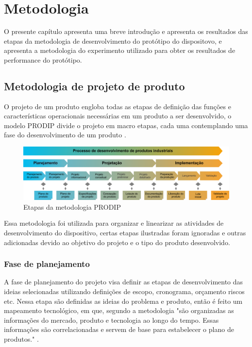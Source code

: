 


\chapter{Metodologia}\label{cap:Metodologia}

O presente capítulo apresenta uma breve introdução e apresenta os resultados das etapas da metodologia de desenvolvimento do protótipo do dispositovo, e apresenta a metodologia do experimento utilizado para obter os resultados de performance do protótipo.

\section{Metodologia de projeto de produto}

O projeto de um produto engloba todas as etapas de definição das funções e características operacionais necessárias em um produto a ser desenvolvido, o modelo PRODIP divide o projeto em macro etapas, cada uma contemplando uma fase do desenvolvimento de um produto \autocite{PRODIP}.

\begin{figure}[htb]
	\caption{\label{fig:Fig_401}Etapas da metodologia PRODIP}
	\begin{center}
		\includegraphics[width=\textwidth]{images/img401.png}
	\end{center}
\end{figure}

Essa metodologia foi utilizada para organizar e linearizar as atividades de desenvolvimento do dispositivo, certas etapas ilustradas foram ignoradas e outras adicionadas devido ao objetivo do projeto e o tipo do produto desenvolvido.

\subsection{Fase de planejamento}

A fase de planejamento do projeto visa definir as etapas de desenvolvimento das ideias selecionadas utilizando definições de escopo, cronograma, orçamento riscos etc. Nessa etapa são definidas as ideias do problema e produto, então é feito um mapeamento tecnológico, em que, segundo a metodologia "são organizadas as informações do mercado, produto e tecnologia ao longo do tempo. Essas informações são correlacionadas e servem de base para estabelecer o plano de produtos." \autocite{PRODIP}.

